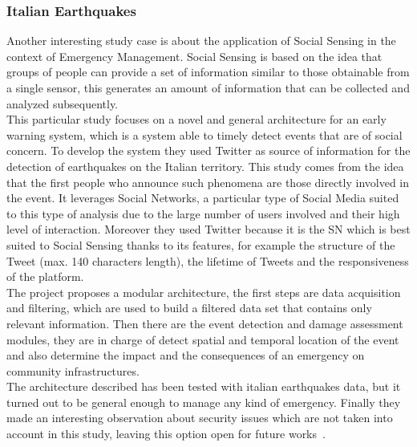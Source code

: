 \subsubsection{Italian Earthquakes}
\noindent Another interesting study case is about the application of Social Sensing in the context of Emergency Management. Social Sensing is based on the idea that groups of people can provide a set of information similar to those obtainable from a single sensor, this generates an amount of information that can be collected and analyzed subsequently.
\\
This particular study focuses on a novel and general architecture for an early warning system, which is a system able to timely detect events that are of social concern. To develop the system they used Twitter as source of information for the detection of earthquakes on the Italian territory. This study comes from the idea that the first people who announce such phenomena are those directly involved in the event. It leverages Social Networks, a particular type of Social Media suited to this type of analysis due to the large number of users involved and their high level of interaction. Moreover they used Twitter because it is the SN which is best suited to Social Sensing thanks to its features, for example the structure of the Tweet (max. 140 characters length), the lifetime of Tweets and the responsiveness of the platform.
\\
The project proposes a modular architecture, the first steps are data acquisition and filtering, which are used to build a filtered data set that contains only relevant information. Then there are the event detection and damage assessment modules, they are in charge of detect spatial and temporal location of the event and also determine the impact and the consequences of an emergency on community infrastructures.
\\
The architecture described has been tested with italian earthquakes data, but it turned out to be general enough to manage any kind of emergency. Finally they made an interesting observation about security issues which are not taken into account in this study, leaving this option open for future works~\cite{italianearthquakes}.

